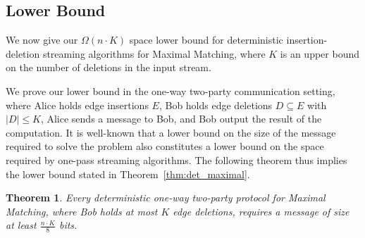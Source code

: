 \documentclass[11pt,a4paper]{article}
\newtheorem{theorem}{Theorem}
\begin{document}
\subsection{Lower Bound} \label{sec:det-lb}
We now give our $\Omega(n \cdot K)$ space lower bound for deterministic insertion-deletion streaming algorithms for \textsf{Maximal Matching}, where $K$ is an upper bound on the number of deletions in the input stream. 

We prove our lower bound in the one-way two-party communication setting, where Alice holds edge insertions $E$,  Bob holds edge deletions $D \subseteq E$ with $|D| \le K$, Alice sends a message to Bob, and Bob output the result of the computation. It is well-known that a lower bound on the size of the message required to solve the problem also constitutes a lower bound on the space required by one-pass streaming algorithms. The following theorem thus implies the lower bound stated in Theorem~\ref{thm:det_maximal}.

\begin{theorem}
 Every deterministic one-way two-party protocol for \textsf{Maximal Matching}, where Bob holds at most $K$ edge deletions, requires a message of size at least $\frac{n \cdot K}{8}$ bits.
\end{theorem}
\end{document}
